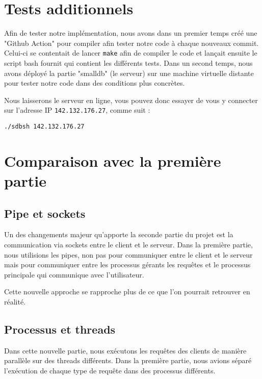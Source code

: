 \documentclass[utf8]{article}
\begin{document}
\section{Tests additionnels}

Afin de tester notre implémentation, nous avons dans un premier temps créé une "Github Action" pour compiler afin tester notre code à chaque nouveaux commit. Celui-ci se contentait de lancer \texttt{make} afin de compiler le code et lançait ensuite le script bash fournit qui contient les différents tests. Dans un second temps, nous avons déployé la partie "smalldb" (le serveur) sur une machine virtuelle distante pour tester notre code dans des conditions plus concrètes.

Nous laisserons le serveur en ligne, vous pouvez donc essayer de vous y connecter sur l'adresse IP \texttt{142.132.176.27}, comme suit :

\begin{lstlisting}
./sdbsh 142.132.176.27
\end{lstlisting}


\section{Comparaison avec la première partie}

\subsection{Pipe et sockets}

Un des changements majeur qu'apporte la seconde partie du projet est la communication via sockets entre le client et le serveur. Dans la première partie, nous utilisions les pipes, non pas pour communiquer entre le client et le serveur mais pour communiquer entre les processus gérants les requêtes et le processus principale qui communique avec l'utilisateur.

Cette nouvelle approche se rapproche plus de ce que l'on pourrait retrouver en réalité. 

\subsection{Processus et threads}

Dans cette nouvelle partie, nous exécutons les requêtes des clients de manière parallèle sur des threads différents. Dans la première partie, nous avions séparé l'exécution de chaque type de requête dans des processus différents.
\end{document}
